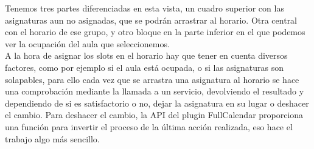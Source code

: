 Tenemos tres partes diferenciadas en esta vista, un cuadro superior con las asignaturas aun no asignadas, que se podrán arrastrar al horario. Otra central con el horario de ese grupo, y otro bloque en la parte inferior en el que podemos ver la ocupación del aula que seleccionemos.\\

A la hora de asignar los slots en el horario hay que tener en cuenta diversos factores, como por ejemplo si el aula está ocupada, o si las asignaturas son solapables, para ello cada vez que se arrastra una asignatura al horario se hace una comprobación mediante la llamada a un servicio, devolviendo el resultado y dependiendo de si es satisfactorio o no, dejar la asignatura en su lugar o deshacer el cambio. Para deshacer el cambio, la API del plugin FullCalendar proporciona una función para invertir el proceso de la última acción realizada, eso hace el trabajo algo más sencillo.

